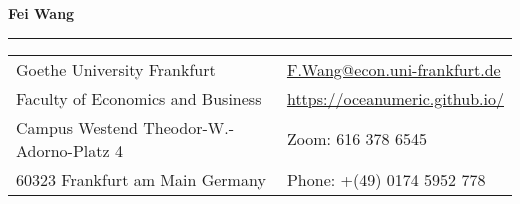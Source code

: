 \documentclass[letterpaper,11pt,oneside]{article}
\begin{document}

\noindent  \LARGE{\textbf{Fei Wang}} \\
\vspace{-2ex} 
\hrule 
\normalsize


\begin{center}
\begin{tabular}{l l}
 Goethe University Frankfurt    & \hspace{1in} \href{mailto:F.Wang@econ.uni-frankfurt.de}{F.Wang@econ.uni-frankfurt.de} \\
 Faculty of Economics and Business    & \hspace{1in}  \href{https://oceanumeric.github.io/}{https://oceanumeric.github.io/}   \\
 Campus Westend
Theodor-W.-Adorno-Platz 4            & \hspace{1in} Zoom: 
616 378 6545   \\
60323 Frankfurt am Main
Germany & \hspace{1in} Phone: +(49) 0174 5952 778 \\
\end{tabular}
\end{center}

\vspace{1em}

\end{document}
